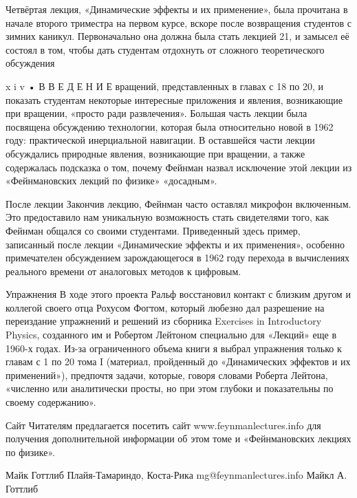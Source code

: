 \documentclass[10pt,oneside]{article}
\begin{document}
Четвёртая лекция, «Динамические эффекты и их применение», была прочитана в начале второго триместра на первом курсе, вскоре после возвращения студентов с зимних каникул. Первоначально она должна была стать лекцией 21, и замысел её состоял в том, чтобы дать студентам отдохнуть от сложного теоретического обсуждения\par

x i v • В В Е Д Е Н И Е вращений, представленных в главах с 18 по 20, и показать студентам некоторые интересные приложения и явления, возникающие при вращении, «просто ради развлечения». Большая часть лекции была посвящена обсуждению технологии, которая была относительно новой в 1962 году: практической инерциальной навигации. В оставшейся части лекции обсуждались природные явления, возникающие при вращении, а также содержалась подсказка о том, почему Фейнман назвал исключение этой лекции из «Фейнмановских лекций по физике» «досадным».\par

После лекции Закончив лекцию, Фейнман часто оставлял микрофон включенным. Это предоставило нам уникальную возможность стать свидетелями того, как Фейнман общался со своими студентами. Приведенный здесь пример, записанный после лекции «Динамические эффекты и их применения», особенно примечателен обсуждением зарождающегося в 1962 году перехода в вычислениях реального времени от аналоговых методов к цифровым.\par

Упражнения В ходе этого проекта Ральф восстановил контакт с близким другом и коллегой своего отца Рохусом Фогтом, который любезно дал разрешение на переиздание упражнений и решений из сборника Exercises in Introductory Physics, созданного им и Робертом Лейтоном специально для «Лекций» еще в 1960-х годах. Из-за ограниченного объема книги я выбрал упражнения только к главам с 1 по 20 тома I (материал, пройденный до «Динамических эффектов и их применений»), предпочтя задачи, которые, говоря словами Роберта Лейтона, «численно или аналитически просты, но при этом глубоки и показательны по своему содержанию».\par

Сайт Читателям предлагается посетить сайт www.feynmanlectures.info для получения дополнительной информации об этом томе и «Фейнмановских лекциях по физике».\par

Майк Готтлиб Плайя-Тамариндо, Коста-Рика mg@feynmanlectures.info Майкл А. Готтлиб\par
\end{document}
